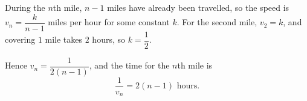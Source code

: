 During the $n$th mile, $n-1$ miles have already been travelled, so the speed is $v_n=\dfrac{k}{n-1}$ miles per hour for some constant $k$. For the second mile, $v_2=k$, and covering $1$ mile takes $2$ hours, so $k=\dfrac{1}{2}$.

Hence $v_n=\dfrac{1}{2(n-1)}$, and the time for the $n$th mile is
\[
\dfrac{1}{v_n}=\boxed{2(n-1)}\text{ hours}.
\]
